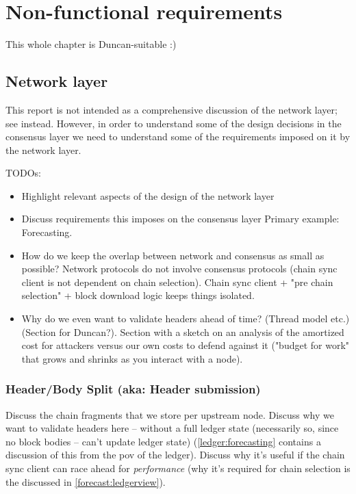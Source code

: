 \chapter{Non-functional requirements}

This whole chapter is Duncan-suitable :)
\duncan

\section{Network layer}

This report is not intended as a comprehensive discussion of the network layer;
see \cite{network-spec} instead. However, in order to understand
some of the design decisions in the consensus layer we need to understand some
of the requirements imposed on it by the network layer.

TODOs:

\begin{itemize}
\item Highlight relevant aspects of the design of the network layer
\item Discuss requirements this imposes on the consensus layer
Primary example: Forecasting.
\item How do we keep the overlap between network and consensus as small
as possible? Network protocols do not involve consensus protocols
(chain sync client is not dependent on chain selection). Chain sync
client + "pre chain selection" + block download logic keeps things isolated.
\item Why do we even want to validate headers ahead of time? (Thread model etc.)
(Section for Duncan?).
Section with a sketch on an analysis of the amortized cost for attackers versus
our own costs to defend against it ("budget for work" that grows and shrinks
as you interact with a node).
\end{itemize}

\subsection{Header/Body Split (aka: Header submission)}
\label{header-body}

Discuss the chain fragments that we store per upstream node.
Discuss why we want to validate headers here -- without a full ledger state
(necessarily so, since no block bodies -- can't update ledger state)
(\cref{ledger:forecasting} contains a discussion of this from the pov of
the ledger).
Discuss why it's useful if the chain sync client can race ahead  for
\emph{performance} (why it's required for chain selection is the discussed in
\cref{forecast:ledgerview}).

